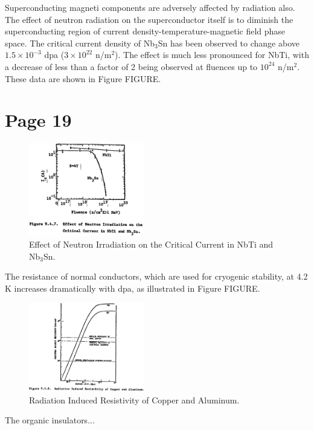 \documentclass[11pt]{article}
\begin{document}
Superconducting magneti components are adversely affected by radiation also. The effect of neutron radiation on the superconductor itself is to diminish the superconducting region of current density-temperature-magnetic field phase space. The critical current density of Nb$_3$Sn has been observed to change above ~$1.5\times 10^{-3}$ dpa ($3\times 10^{22}$ n/m$^2$). The effect is much less pronounced for NbTi, with a decrease of less than a factor of 2 being observed at fluences up to $10^{24}$ n/m$^2$. These data are shown in Figure FIGURE.

\section{Page 19}

\begin{figure}[H]
  \centering
  \includegraphics[width=0.45\textwidth]{figs/fig16.png}
  \caption{Effect of Neutron Irradiation on the Critical Current in NbTi and Nb$_3$Sn.}
\end{figure}

The resistance of normal conductors, which are used for cryogenic stability, at 4.2 K increases dramatically with dpa, as illustrated in Figure FIGURE.

\begin{figure}[H]
  \centering
  \includegraphics[width=0.45\textwidth]{figs/fig17.png}
  \caption{Radiation Induced Resistivity of Copper and Aluminum.}
\end{figure}

The organic insulators...
\end{document}
